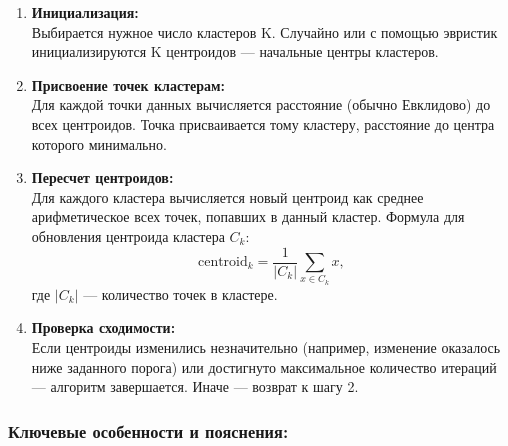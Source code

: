 \documentclass[11pt]{article}
\begin{document}
\begin{enumerate}
    \item \textbf{Инициализация:} \\
    Выбирается нужное число кластеров K. Случайно или с помощью эвристик инициализируются K центроидов — начальные центры кластеров.
    
    \item \textbf{Присвоение точек кластерам:} \\
    Для каждой точки данных вычисляется расстояние (обычно Евклидово) до всех центроидов. Точка присваивается тому кластеру, расстояние до центра которого минимально.
    
    \item \textbf{Пересчет центроидов:} \\
    Для каждого кластера вычисляется новый центроид как среднее арифметическое всех точек, попавших в данный кластер. Формула для обновления центроида кластера $C_k$:
    \[
    \text{centroid}_k = \frac{1}{|C_k|} \sum_{x \in C_k} x,
    \]
    где $|C_k|$ — количество точек в кластере.
    
    \item \textbf{Проверка сходимости:} \\
    Если центроиды изменились незначительно (например, изменение оказалось ниже заданного порога) или достигнуто максимальное количество итераций — алгоритм завершается. Иначе — возврат к шагу 2.
\end{enumerate}

\subsubsection{Ключевые особенности и пояснения:}
\end{document}
